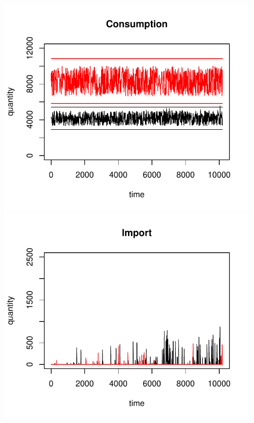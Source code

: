 \documentclass{article}
\begin{document}
\vskip2mm
\hskip-1cm
\includegraphics[scale=0.5]{fig_case06_consumption}
\includegraphics[scale=0.5]{fig_case06_import}
\end{document}
